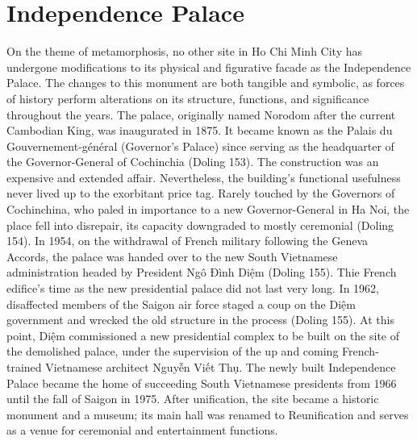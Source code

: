 \section{Independence Palace}
\vi

On the theme of metamorphosis, no other site in Ho Chi Minh City has undergone modifications to its physical and figurative facade as the Independence Palace. The changes to this monument are both tangible and symbolic, as forces of history perform alterations on its structure, functions, and significance throughout the years. The palace, originally named Norodom after the current Cambodian King, was inaugurated in 1875. It became known as the Palais du Gouvernement-général (Governor’s Palace)  since serving as the headquarter of the Governor-General of Cochinchia (Doling 153). The construction was an expensive and extended affair. Nevertheless, the building’s functional usefulness never lived up to the exorbitant price tag. Rarely touched by the Governors of Cochinchina, who paled in importance to a new Governor-General in Ha Noi, the place fell into disrepair, its capacity downgraded to mostly ceremonial (Doling 154). In 1954, on the withdrawal of French military following the Geneva Accords, the palace was handed over to the new South Vietnamese administration headed by President Ngô Đình Diệm (Doling 155). Thie French edifice’s time as the new presidential palace did not last very long. In 1962, disaffected members of the Saigon air force staged a coup on the Diệm government and wrecked the old structure in the process (Doling 155). At this point, Diệm commissioned a new presidential complex to be built on the site of the demolished palace, under the supervision of the up and coming French-trained Vietnamese architect Nguyễn Viết Thụ. The newly built Independence Palace became the home of succeeding South Vietnamese presidents from 1966 until the fall of Saigon in 1975. After unification, the site became a historic monument and a museum; its main hall was renamed to Reunification and serves as a venue for ceremonial and entertainment functions.


